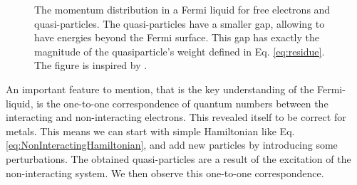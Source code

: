 \documentclass[../main.tex]{subfile}
\begin{document}
\begin{figure}[H]\centering

        \caption{The momentum distribution in a Fermi liquid for free electrons and quasi-particles. The quasi-particles have a smaller gap, allowing to have energies beyond the 
        Fermi surface. This gap has exactly the magnitude of the quasiparticle's weight defined in Eq. \ref{eq:residue}. The figure is inspired by \cite{FossheimSudbo2004}.}
    \end{figure}

An important feature to mention, that is the key understanding of the Fermi-liquid, is the one-to-one correspondence of quantum numbers between the interacting and non-interacting electrons. 
This revealed itself to be correct for metals.
This means we can start with simple Hamiltonian like Eq. \ref{eq:NonInteractingHamiltonian}, and add new particles by introducing
some perturbations. The obtained quasi-particles are a result of the excitation of the non-interacting system. We then observe this
one-to-one correspondence.\\
\end{document}
